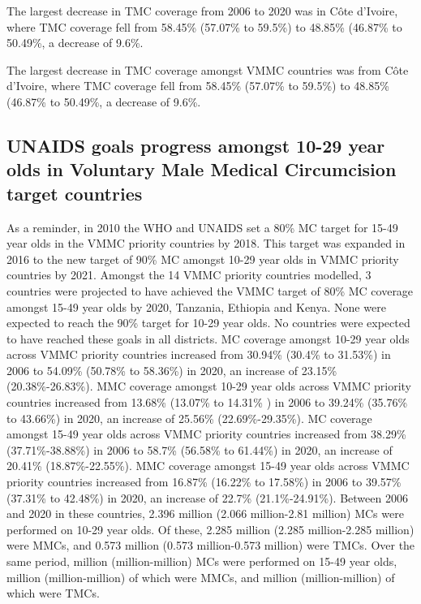 \documentclass{article}
\begin{document}
The largest decrease in TMC coverage from 2006 to 2020 was in Côte d’Ivoire, where TMC coverage fell from 58.45\% (57.07\% to 59.5\%) to 48.85\% (46.87\% to 50.49\%, a decrease of 9.6\%.

The largest decrease in TMC coverage amongst VMMC countries was from Côte d’Ivoire, where TMC coverage fell from 58.45\% (57.07\% to 59.5\%) to 48.85\% (46.87\% to 50.49\%, a decrease of 9.6\%.


\subsection{UNAIDS goals progress amongst 10-29 year olds in Voluntary Male Medical Circumcision target countries}
\label{sec:orgf9204d9}

As a reminder, in 2010 the WHO and UNAIDS set a 80\% MC target for 15-49 year olds in the VMMC
priority countries by 2018. This target was expanded in 2016 to the new target of 90\% MC amongst 10-29
year olds in VMMC priority countries by 2021.
Amongst the 14 VMMC priority countries modelled, 3 countries were projected to have achieved the VMMC
target of 80\% MC coverage amongst 15-49 year olds by 2020, Tanzania, Ethiopia and Kenya. None were
expected to reach the 90\% target for 10-29 year olds. No countries were expected to have reached these goals
in all districts.
MC coverage amongst 10-29 year olds across VMMC priority countries increased from 30.94\% (30.4\% to
31.53\%) in 2006 to 54.09\% (50.78\% to 58.36\%) in 2020, an increase of 23.15\% (20.38\%-26.83\%). MMC
coverage amongst 10-29 year olds across VMMC priority countries increased from 13.68\% (13.07\% to 14.31\%
) in 2006 to 39.24\% (35.76\% to 43.66\%) in 2020, an increase of 25.56\% (22.69\%-29.35\%). MC coverage
amongst 15-49 year olds across VMMC priority countries increased from 38.29\% (37.71\%-38.88\%) in
2006 to 58.7\% (56.58\% to 61.44\%) in 2020, an increase of 20.41\% (18.87\%-22.55\%). MMC coverage
amongst 15-49 year olds across VMMC priority countries increased from 16.87\% (16.22\% to 17.58\%) in
2006 to 39.57\% (37.31\% to 42.48\%) in 2020, an increase of 22.7\% (21.1\%-24.91\%).
Between 2006 and 2020 in these countries, 2.396 million (2.066 million-2.81 million) MCs were performed
on 10-29 year olds. Of these, 2.285 million (2.285 million-2.285 million) were MMCs, and 0.573 million
(0.573 million-0.573 million) were TMCs. Over the same period, million (million-million) MCs were
performed on 15-49 year olds, million (million-million) of which were MMCs, and million (million-million) of which were TMCs.
\end{document}
